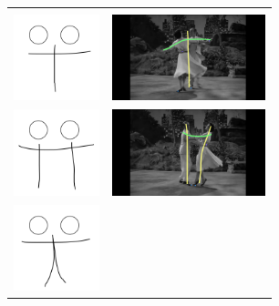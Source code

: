 \begin{table}[h!]
\begin{tabular}{ll}
\begin{minipage}{.28\textwidth}
    \end{minipage} \\
	\begin{minipage}{.28\textwidth}
      \includegraphics[width=\linewidth, height=25mm]{img/03keyframe}
    \end{minipage} & 
    \begin{minipage}{.28\textwidth}
      \includegraphics[width=\linewidth, height=25mm]{img/keyframe_case_3_(2)}
    \end{minipage} \\
	\begin{minipage}{.28\textwidth}
      \includegraphics[width=\linewidth, height=25mm]{img/04keyframe}
    \end{minipage} &
    \begin{minipage}{.28\textwidth}
      \includegraphics[width=\linewidth, height=25mm]{img/keyframe_case_4_(3)}
    \end{minipage}  \\
	\begin{minipage}{.28\textwidth}
      \includegraphics[width=\linewidth, height=25mm]{img/05keyframe}

\end{minipage}
\end{tabular}
\end{table}
